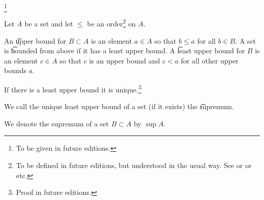 
\footnote{To be given in future editions.}


Let $A$ be a set and let $\leq$ be an order\footnote{To be defined in future editions, but understood in the usual way. See  or  or  etc.} on $A$.

An \t{upper bound} for $B \subset A$ is an element $a \in A$ so that $b \leq a$ for all $b \in B$.
A set is \t{bounded from above} if it has a least upper bound.
A \t{least upper bound} for $B$ is an element $c \in A$ so that $c$ is an upper bound and $c < a$ for all other upper bounds $a$.

\begin{proposition}
  If there is a least upper bound it is unique.\footnote{Proof in future editions.}
\end{proposition}

We call the unique least upper bound of a set (if it exists) the \t{supremum}.


We denote the supremum of a set $B \subset A$ by $\sup A$.

\blankpage
